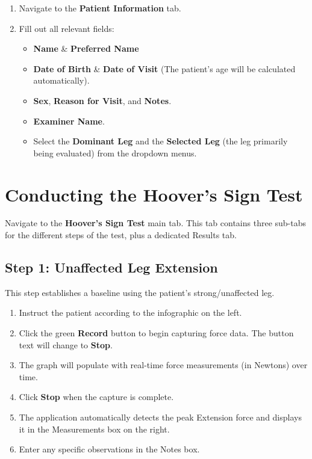 \documentclass[11pt,a4paper]{article}
\begin{document}
\begin{enumerate}[label=\textbf{\arabic*.}]
    \item Navigate to the \textbf{Patient Information} tab.
    \item Fill out all relevant fields:
    \begin{itemize}
        \item \textbf{Name} \& \textbf{Preferred Name}
        \item \textbf{Date of Birth} \& \textbf{Date of Visit} (The patient's age will be calculated automatically).
        \item \textbf{Sex}, \textbf{Reason for Visit}, and \textbf{Notes}.
        \item \textbf{Examiner Name}.
        \item Select the \textbf{Dominant Leg} and the \textbf{Selected Leg} (the leg primarily being evaluated) from the dropdown menus.
    \end{itemize}
\end{enumerate}

\section{Conducting the Hoover's Sign Test}
Navigate to the \textbf{Hoover's Sign Test} main tab. This tab contains three sub-tabs for the different steps of the test, plus a dedicated Results tab.

\subsection{Step 1: Unaffected Leg Extension}
This step establishes a baseline using the patient's strong/unaffected leg.
\begin{enumerate}
    \item Instruct the patient according to the infographic on the left.
    \item Click the green \textbf{Record} button to begin capturing force data. The button text will change to \textbf{Stop}.
    \item The graph will populate with real-time force measurements (in Newtons) over time.
    \item Click \textbf{Stop} when the capture is complete. 
    \item The application automatically detects the peak Extension force and displays it in the Measurements box on the right.
    \item Enter any specific observations in the Notes box.
\end{enumerate}
\end{document}
